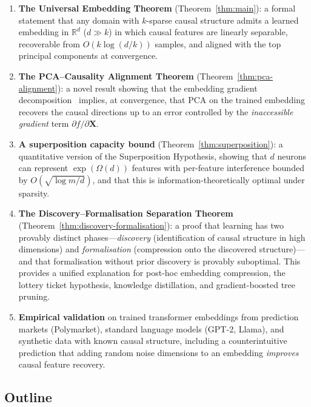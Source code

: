 \documentclass[11pt,a4paper]{article}
\theoremstyle{plain}
\theoremstyle{definition}
\theoremstyle{remark}
\newcommand{\R}{\mathbb{R}}
\begin{document}
\begin{enumerate}[leftmargin=2em,itemsep=3pt]
  \item \textbf{The Universal Embedding Theorem} (Theorem~\ref{thm:main}):  
    a formal statement that any domain with $k$-sparse causal structure admits a
    learned embedding in $\R^d$ ($d \gg k$) in which causal features are
    linearly separable, recoverable from $O(k\log(d/k))$ samples, and aligned
    with the top principal components at convergence.

  \item \textbf{The PCA--Causality Alignment Theorem}
    (Theorem~\ref{thm:pca-alignment}): a novel result showing that the embedding
    gradient decomposition~\citep[Ch.~2]{omega2026} implies, at convergence, that
    PCA on the trained embedding recovers the causal directions up to an error
    controlled by the \emph{inaccessible gradient} term $\partial f/\partial
    \mathbf{X}$.

  \item \textbf{A superposition capacity bound}
    (Theorem~\ref{thm:superposition}): a quantitative version of the
    Superposition Hypothesis, showing that $d$ neurons can represent
    $\exp(\Omega(d))$ features with per-feature interference bounded by
    $O(\sqrt{\log m / d})$, and that this is information-theoretically optimal
    under sparsity.

  \item \textbf{The Discovery--Formalisation Separation Theorem}
    (Theorem~\ref{thm:discovery-formalisation}): a proof that learning has two
    provably distinct phases---\emph{discovery} (identification of causal
    structure in high dimensions) and \emph{formalisation} (compression onto the
    discovered structure)---and that formalisation without prior discovery is
    provably suboptimal.  This provides a unified explanation for post-hoc
    embedding compression, the lottery ticket hypothesis, knowledge
    distillation, and gradient-boosted tree pruning.

  \item \textbf{Empirical validation} on trained transformer embeddings from
    prediction markets (Polymarket), standard language models (GPT-2, Llama), and
    synthetic data with known causal structure, including a counterintuitive
    prediction that adding random noise dimensions to an embedding
    \emph{improves} causal feature recovery.
\end{enumerate}


\subsection{Outline}
\end{document}
